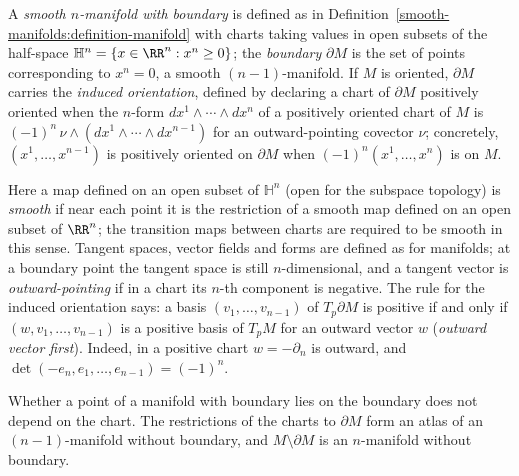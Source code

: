 \begin{definition}\label{differential-forms:definition-manifold-with-boundary}
A \emph{smooth $n$-manifold with boundary} is defined as in Definition~\ref{smooth-manifolds:definition-manifold} with charts taking values in open subsets of the half-space
$\mathbb{H}^n = \{x \in \RR^n : x^n \geq 0\}$; the \emph{boundary} $\partial M$ is the set of points corresponding to $x^n = 0$, a smooth $(n-1)$-manifold. If $M$ is oriented, $\partial M$ carries the
\emph{induced orientation}, defined by declaring a chart of $\partial M$ positively oriented when the $n$-form $dx^1 \wedge \cdots \wedge dx^n$ of a positively oriented chart of $M$ is $(-1)^n\,\nu \wedge
(dx^1 \wedge \cdots \wedge dx^{n-1})$ for an outward-pointing covector $\nu$; concretely, $(x^1, \ldots, x^{n-1})$ is positively oriented on $\partial M$ when $(-1)^n(x^1, \ldots, x^n)$ is on $M$.
\end{definition}

Here a map defined on an open subset of $\mathbb{H}^n$ (open for the subspace topology) is \emph{smooth} if near each point it is the restriction of a smooth map defined on an open subset of $\RR^n$;
the transition maps between charts are required to be smooth in this sense. Tangent spaces, vector fields and forms are defined as for manifolds; at a boundary point the tangent space is
still $n$-dimensional, and a tangent vector is \emph{outward-pointing} if in a chart its $n$-th component is negative. The rule for the induced orientation says: a basis
$(v_1, \ldots, v_{n-1})$ of $T_p\partial M$ is positive if and only if $(w, v_1, \ldots, v_{n-1})$ is a positive basis of $T_pM$ for an outward vector $w$ (\emph{outward vector first}).
Indeed, in a positive chart $w = -\partial_n$ is outward, and $\det(-e_n, e_1, \ldots, e_{n-1}) = (-1)^n$.

\begin{lemma}\label{differential-forms:lemma-boundary-well-defined}
Whether a point of a manifold with boundary lies on the boundary does not depend on the chart. The restrictions of the charts to $\partial M$ form an atlas of an $(n-1)$-manifold without
boundary, and $M \setminus \partial M$ is an $n$-manifold without boundary.
\end{lemma}

